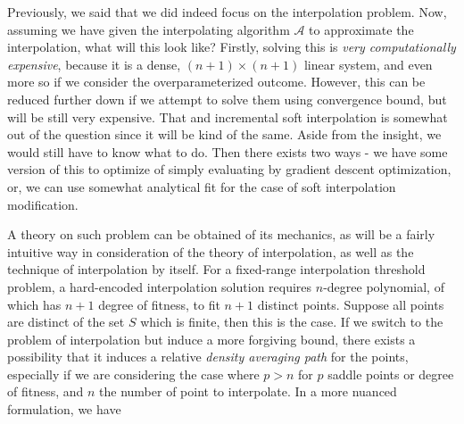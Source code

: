 Previously, we said that we did indeed focus on the interpolation problem. Now, assuming we have given the interpolating algorithm $\mathcal{A}$ to approximate the interpolation, what will this look like? Firstly, solving this is \textit{very computationally expensive}, because it is a dense, $(n+1)\times(n+1)$ linear system, and even more so if we consider the overparameterized outcome. However, this can be reduced further down if we attempt to solve them using convergence bound, but will be still very expensive. That and incremental soft interpolation is somewhat out of the question since it will be kind of the same. Aside from the insight, we would still have to know what to do. Then there exists two ways - we have some version of this to optimize of simply evaluating by gradient descent optimization, or, we can use somewhat analytical fit for the case of soft interpolation modification. 

A theory on such problem can be obtained of its mechanics, as will be a fairly intuitive way in consideration of the theory of interpolation, as well as the technique of interpolation by itself. For a fixed-range interpolation threshold problem, a hard-encoded interpolation solution requires $n$-degree polynomial, of which has $n+1$ degree of fitness, to fit $n+1$ distinct points. Suppose all points are distinct of the set $S$ which is finite, then this is the case. If we switch to the problem of interpolation but induce a more forgiving bound, there exists a possibility that it induces a relative \textit{density averaging path} for the points, especially if we are considering the case where $p>n$ for $p$ saddle points or degree of fitness, and $n$ the number of point to interpolate. In a more nuanced formulation, we have

